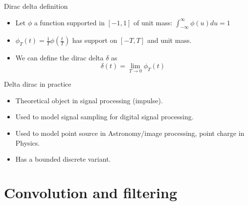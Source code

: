   \begin{block}{ Dirac delta definition}

    \begin{itemize}
      \item Let $\phi$ a function supported in $[-1,1]$ of unit mass: $\int_{-\infty}^\infty \phi(u)du=1$ 
      \item  $\phi_T(t)=\frac{1}{T}\phi(\frac{t}{T})$ has support on $[-T,T]$ and unit mass.
      \item We can define the dirac delta $\delta$ as
      $$ \delta(t)=\lim_{T\rightarrow 0} \phi_T(t) $$


    \end{itemize}
    
    
    \end{block}


    \begin{block}{Delta dirac in practice}
      \begin{itemize}
        \item Theoretical object in signal processing (impulse).
        \item Used to model signal sampling for digital signal processing.
        \item Used to model point source  in Astronomy/image processing, point charge in Physics.
        \item Has a bounded discrete variant.
      \end{itemize}
    \end{block}
    

\section{Convolution and filtering}
\label{sec:conv_filtering}

